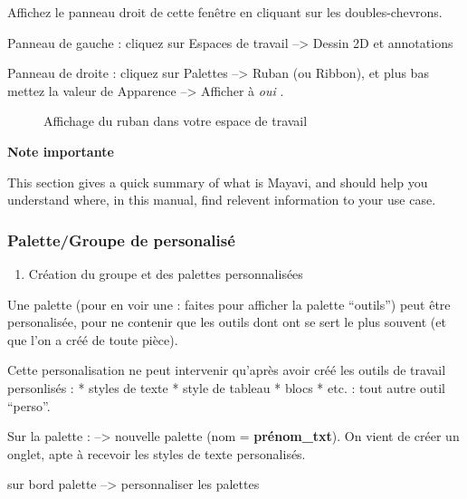 \documentclass[a4paper,12pt,french]{sphinxmanual}
\begin{document}
Affichez le panneau droit de cette fenêtre en cliquant sur les doubles-chevrons.

Panneau de gauche : cliquez sur Espaces de travail --\textgreater{} Dessin 2D et annotations

Panneau de droite : cliquez sur Palettes --\textgreater{} Ruban (ou Ribbon), et plus bas mettez la valeur de Apparence --\textgreater{} Afficher à \emph{oui} .
\begin{figure}[htbp]
\centering
\capstart

\noindent{}
\caption{Affichage du ruban dans votre espace de travail}\label{acad/config_acad:id2}\end{figure}

\begin{sphinxShadowBox}
\textbf{Note importante}

\medskip


This section gives a quick summary of what is Mayavi, and should help
you understand where, in this manual, find relevent information to
your use case.
\end{sphinxShadowBox}


\subsubsection{Palette/Groupe de personalisé}
\label{acad/config_acad:palette-groupe-de-personalise}\begin{enumerate}
\item {} 
Création du groupe et des palettes personnalisées

\end{enumerate}

Une palette (pour en voir une : faites  pour afficher la palette ``outils'') peut être personalisée, pour ne contenir que les outils dont ont se sert le plus souvent (et que l'on a créé de toute pièce).

Cette personalisation ne peut intervenir qu'après avoir créé les outils de travail personlisés :
* styles de texte
* style de tableau
* blocs
* etc. : tout autre outil ``perso''.

Sur la palette :  --\textgreater{} nouvelle palette (nom = \textbf{prénom\_txt}). On vient de créer un onglet, apte à recevoir les styles de texte personalisés.

 sur bord palette --\textgreater{} personnaliser les palettes
\end{document}
